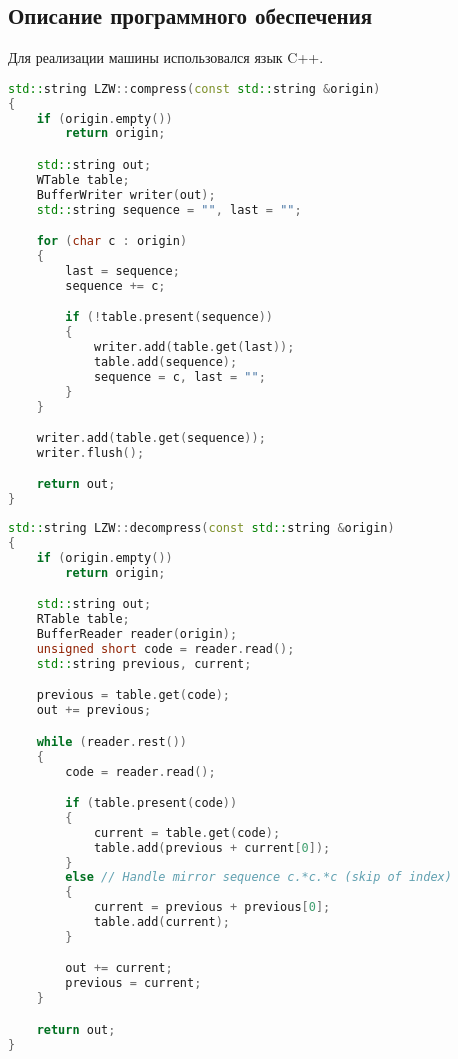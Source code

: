 
\subsection{Описание программного обеспечения}

Для реализации машины использовался язык C++.

\begin{lstlisting}[language=c++, caption={Метод, реализующий сжатие}]
std::string LZW::compress(const std::string &origin)
{
    if (origin.empty())
        return origin;

    std::string out;
    WTable table;
    BufferWriter writer(out);
    std::string sequence = "", last = "";

    for (char c : origin)
    {
        last = sequence;
        sequence += c;

        if (!table.present(sequence))
        {
            writer.add(table.get(last));
            table.add(sequence);
            sequence = c, last = "";
        }
    }

    writer.add(table.get(sequence));
    writer.flush();

    return out;
}
\end{lstlisting}

\clearpage

\begin{lstlisting}[language=c++, caption={Метод, реализующий распаковку}]
std::string LZW::decompress(const std::string &origin)
{
    if (origin.empty())
        return origin;

    std::string out;
    RTable table;
    BufferReader reader(origin);
    unsigned short code = reader.read();
    std::string previous, current;

    previous = table.get(code);
    out += previous;

    while (reader.rest())
    {
        code = reader.read();

        if (table.present(code))
        {
            current = table.get(code);
            table.add(previous + current[0]);
        }
        else // Handle mirror sequence c.*c.*c (skip of index)
        {
            current = previous + previous[0];
            table.add(current);
        }

        out += current;
        previous = current;
    }

    return out;
}
\end{lstlisting}

